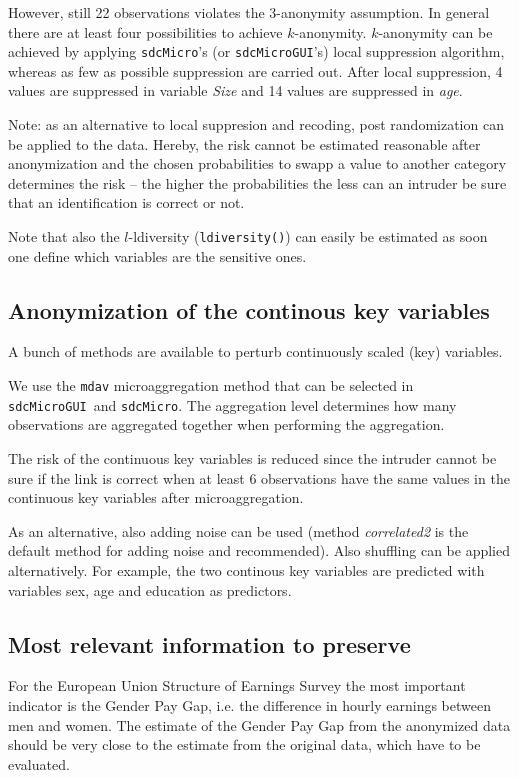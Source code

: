 \documentclass[12pt]{scrartcl}\usepackage[]{graphicx}\usepackage[]{color}
\newcommand{\sdcMicro}{\texttt{sdcMicro}}
\newcommand{\sdcMicroGUI}{\texttt{sdcMicroGUI}}
\begin{document}
However, still 22 observations violates the $3$-anonymity assumption. In general there are at least four possibilities to achieve $k$-anonymity. $k$-anonymity can be achieved by applying \sdcMicro 's (or \sdcMicroGUI 's) local suppression algorithm, whereas as few as possible suppression are carried out. After local suppression, 4 values are suppressed in variable \textit{Size} and 14 values are suppressed in \textit{age}.

Note: as an alternative to local suppresion and recoding, post randomization can be applied to the data. Hereby, the risk cannot be estimated reasonable after anonymization and the chosen probabilities to swapp a value to another category determines the risk -- the higher the probabilities the less can an intruder be sure that an identification is correct or not.

Note that also the $l$-ldiversity (\lstinline{ldiversity()}) can easily be estimated as soon one define which variables are the sensitive ones.

\subsection{Anonymization of the continous key variables}
A bunch of methods are available to perturb continuously scaled (key) variables.

We use the \texttt{mdav} microaggregation method that can be selected in \sdcMicroGUI \ and \sdcMicro . The aggregation level determines how many observations are aggregated together when performing the aggregation. 

The risk of the continuous key variables is reduced since the intruder cannot be sure if the link is correct when at least 6 observations have the same values in the continuous key variables after microaggregation.

As an alternative, also adding noise can be used (method \textit{correlated2} is the default method for adding noise and recommended). Also shuffling can be applied alternatively. For example, the two continous key variables are predicted with variables sex,  age  and education as predictors.

\subsection{Most relevant information to preserve}
For the European Union Structure of Earnings Survey the most important indicator is the Gender Pay Gap, i.e. the difference in hourly earnings between men and women. The estimate of the Gender Pay Gap from the anonymized data should be very close to the estimate from the original data, which have to be evaluated.
\end{document}
